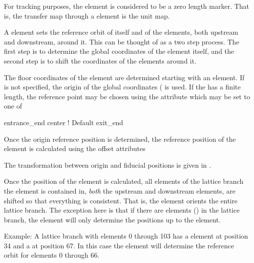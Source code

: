 For tracking purposes, the  element is considered to be a
zero length marker. That is, the transfer map through a 
element is the unit map.

A  element sets the reference orbit of itself and of the
elements, both upstream and downstream, around it. This can be thought
of as a two step process. The first step is to determine the global
coordinates of the  element itself, and the second step is
to shift the coordinates of the elements around it.

The floor coordinates of the  element are determined
starting with an  element. If  is not
specified, the origin of the global coordinates ( is
used. If the  has a finite length, the reference point
may be chosen using the  attribute which
may be set to one of
\begin{example}
  entrance_end
  center         ! Default
  exit_end
\end{example}

Once the origin reference position is determined, the reference
position of the  element is calculated using the offset
attributes 
\begin{example}
\end{example}
The transformation between origin and fiducial positions is given in
.

Once the position of the  element is calculated, all
elements of the lattice branch the  element is contained
in, {\em both} the upstream and downstream elements, are shifted so
that everything is consistent. That is, the  element
orients the entire lattice branch. The exception here is that if there
are   elements () in the lattice
branch, the  element will only determine the positions up
to the   element. 

Example: A lattice branch with elements 0 through 103 has a
 element at position 34 and a   at
position 67. In this case the  element will determine the
reference orbit for elements 0 through 66.

